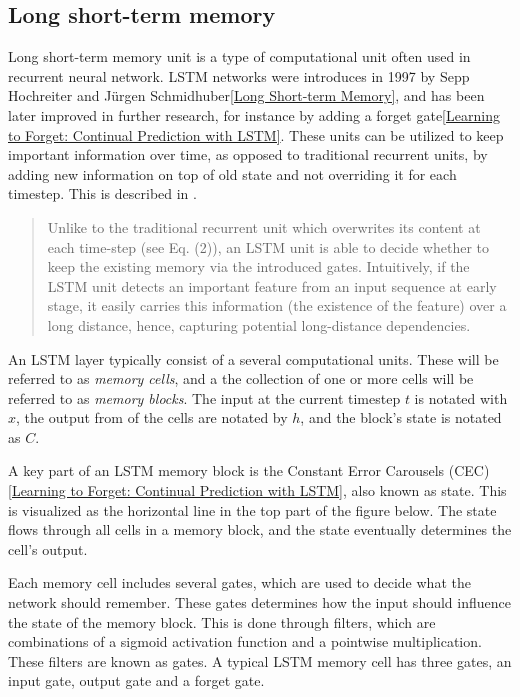 \subsection{Long short-term memory}
Long short-term memory unit is a type of computational unit often used in recurrent neural network. LSTM networks were introduces in 1997 by Sepp Hochreiter and Jürgen Schmidhuber\ref{Long Short-term Memory}, and has been later improved in further research, for instance by adding a forget gate\ref{Learning to Forget: Continual Prediction with LSTM}. These units can be utilized to keep important information over time, as opposed to traditional recurrent units, by adding new information on top of old state and not overriding it for each timestep. This is described in \cite{Empirical evaluation of gated recurrent neural networks on sequence modeling}.

\begin{quote} %
    Unlike to the traditional recurrent unit which overwrites its content at each time-step (see Eq. (2)),
    an LSTM unit is able to decide whether to keep the existing memory via the introduced gates.
    Intuitively, if the LSTM unit detects an important feature from an input sequence at early stage, it
    easily carries this information (the existence of the feature) over a long distance, hence, capturing
    potential long-distance dependencies.
\end{quote}

An LSTM layer typically consist of a several computational units. These will be referred to as \textit{memory cells}, and a the collection of one or more cells will be referred to as \textit{memory blocks}. The input at the current timestep $t$ is notated with $x$, the output from of the cells are notated by $h$, and the block's state is notated as $C$.

A key part of an LSTM memory block is the Constant Error Carousels (CEC) \ref{Learning to Forget: Continual Prediction with LSTM}, also known as state. This is visualized as the horizontal line in the top part of the figure below. The state flows through all cells in a memory block, and the state eventually determines the cell's output.

Each memory cell includes several gates, which are used to decide what the network should remember. These gates determines how the input should influence the state of the memory block. This is done through filters, which are combinations of a sigmoid activation function and a pointwise multiplication. These filters are known as gates. A typical LSTM memory cell has three gates, an input gate, output gate and a forget gate.


